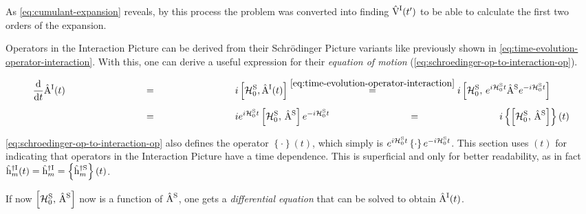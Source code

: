 As \autoref{eq:cumulant-expansion} reveals, by this process the problem was converted into finding $\VhamiltonianOf[\interactionPicture]{t'}$ to be able to calculate the first two orders of the expansion.

Operators in the Interaction Picture can be derived from their Schrödinger Picture variants like previously shown in \autoref{eq:time-evolution-operator-interaction}. 
With this, one can derive a useful expression for their \emph{equation of motion} (\autoref{eq:schroedinger-op-to-interaction-op}).

\begin{equation}
    \label{eq:schroedinger-op-to-interaction-op}
    \begin{split}
        \difft{}\AopOfT[\interactionPicture] &\stackrel{\phantom{\ref{eq:time-evolution-operator-interaction}}}{=} i \left[\HzeroHamiltonian[\schroedingerPicture], \AopOfT[\interactionPicture]\right]
        \stackrel{\ref{eq:time-evolution-operator-interaction}}{=}
        i \left[\HzeroHamiltonian[\schroedingerPicture],\,e^{i \HzeroHamiltonian[\schroedingerPicture]{} t} \Aop[\schroedingerPicture] e^{-i \HzeroHamiltonian[\schroedingerPicture]{} t}\right]\\
        &\stackrel{\phantom{\ref{eq:time-evolution-operator-interaction}}}{=}
        i e^{i \HzeroHamiltonian[\schroedingerPicture]{} t}\left[\HzeroHamiltonian[\schroedingerPicture],\, \Aop[\schroedingerPicture]\right]e^{-i \HzeroHamiltonian[\schroedingerPicture]{} t}
        \stackrel{\phantom{\ref{eq:time-evolution-operator-interaction}}}{=}
        i \left\{\left[\HzeroHamiltonian[\schroedingerPicture],\, \Aop[\schroedingerPicture]\right]\right\}(t)
    \end{split}
\end{equation}

\autoref{eq:schroedinger-op-to-interaction-op} also defines the operator $\left\{\cdot \right\}(t)$, which simply is $e^{i \HzeroHamiltonian[\schroedingerPicture]{} t} \left\{\cdot \right\} e^{-i \HzeroHamiltonian[\schroedingerPicture]{} t}$.
This section uses $(t)$ for indicating that operators in the Interaction Picture have a time dependence. 
This is superficial and only for better readability, as in fact $\hopOfT[\interactionPicture]{m}{\dagger} = \hop[\interactionPicture]{m}{\dagger} = \left\{\hop[\schroedingerPicture]{m}{\dagger} \right\}(t)$.

If now $\left[\HzeroHamiltonian[\schroedingerPicture],\, \Aop[\schroedingerPicture]\right]$ now is a function of $\Aop[\schroedingerPicture]$, one gets a \emph{differential equation} that can be solved to obtain $\AopOfT[\interactionPicture]$.

